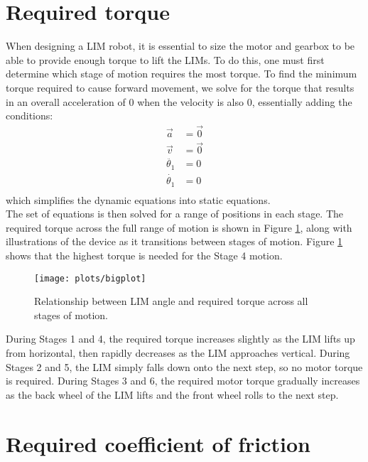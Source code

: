 \section{Required torque}
When designing a LIM robot, it is essential to size the motor and gearbox to be able to provide enough torque to lift the LIMs. To do this, one must first determine which stage of motion requires the most torque. To find the minimum torque required to cause forward movement, we solve for the torque that results in an overall acceleration of 0 when the velocity is also 0, essentially adding the conditions:
\begin{subequations}
	\label{condition-static}
	\begin{align}
		\vec{a} &= \vec{0}\\
		\vec{v} &= \vec{0}\\
		\ddot{\theta_1} &= 0\\
		\dot{\theta_1} &= 0\\
	\end{align}
\end{subequations}
which simplifies the dynamic equations into static equations.\\
The set of equations is then solved for a range of positions in each stage. The required torque across the full range of motion is shown in Figure \ref{fig:bigplot}, along with illustrations of the device as it transitions between stages of motion. Figure \ref{fig:bigplot} shows that the highest torque is needed for the Stage 4 motion.\\


\begin{figure}[h]
	\centering
	\texttt{[image: plots/bigplot]}
	\caption{Relationship between LIM angle and required torque across all stages of motion.}
	\label{fig:bigplot}
\end{figure}

During Stages 1 and 4, the required torque increases slightly as the LIM lifts up from horizontal, then rapidly decreases as the LIM approaches vertical. During Stages 2 and 5, the LIM simply falls down onto the next step, so no motor torque is required. During Stages 3 and 6, the required motor torque gradually increases as the back wheel of the LIM lifts and the front wheel rolls to the next step. 

\section{Required coefficient of friction}

